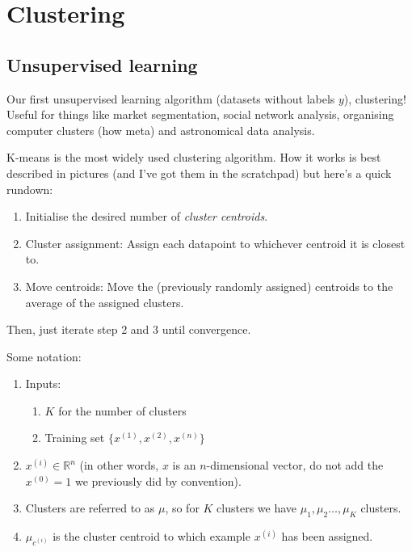 
\chapter{Clustering}

\section{Unsupervised learning}

Our first unsupervised learning algorithm (datasets without labels $y$), clustering! Useful for things like market segmentation, social network analysis, organising computer clusters (how meta) and astronomical data analysis.

K-means is the most widely used clustering algorithm. How it works is best described in pictures (and I've got them in the scratchpad) but here's a quick rundown:

\begin{enumerate}
\item Initialise the desired number of \emph{cluster centroids}.
\item Cluster assignment: Assign each datapoint to whichever centroid it is closest to.
\item Move centroids: Move the (previously randomly assigned) centroids to the average of the assigned clusters.
\end{enumerate}

Then, just iterate step 2 and 3 until convergence.

Some notation:
\begin{enumerate}
\item Inputs:
	\begin{enumerate}
	\item $K$ for the number of clusters
	\item Training set $\{x^{(1)}, x^{(2)}, x^{(n)}\}$
	\end{enumerate}
\item $x^{(i)} \in \mathbb{R}^n$ (in other words, $x$ is an $n$-dimensional vector, do not add the $x^{(0)} = 1$ we previously did by convention).
\item Clusters are referred to as $\mu$, so for $K$ clusters we have $\mu_1, \mu_2 \dots, \mu_K$ clusters.
\item $\mu_{c^{(i)}}$ is the cluster centroid to which example $x^{(i)}$ has been assigned.
\end{enumerate}

